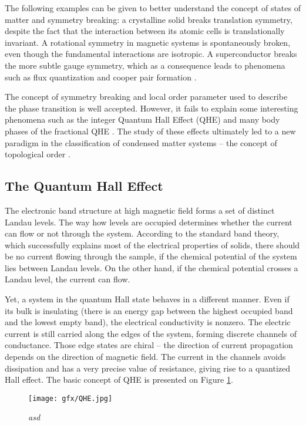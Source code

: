 \documentclass[titlepage,a4paper]{book}
\newcommand{\wciecie}{\quad\phantom{v}}
\begin{document}
The following examples can be given to better understand the concept of states of matter and symmetry breaking: a crystalline solid breaks translation symmetry, despite the fact that the interaction between its atomic cells is translationally invariant. A rotational symmetry in magnetic systems is spontaneously broken, even though the fundamental interactions are isotropic. A superconductor breaks the more subtle gauge symmetry, which as a consequence leads to phenomena such as flux quantization and cooper pair formation \cite{Josephson_Topology}.

The concept of symmetry breaking and local order parameter used to describe the phase transition is well accepted. However, it fails to explain some interesting phenomena such as the integer Quantum Hall Effect (QHE) \cite{Klitzing_Topology} and many body phases of the fractional QHE \cite{Tsui_Topology}. The study of these effects ultimately led to a new paradigm in the classification of condensed matter systems -- the concept of topological order \cite{Laughlin_Topology} \cite{Thouless_Topology}.

\subsection{The Quantum Hall Effect}
\wciecie
The electronic band structure at high magnetic field forms a set of distinct Landau levels. The way how levels are occupied determines whether the current can flow or not through the system. According to the standard band theory, which successfully explains most of the electrical properties of solids, there should be no current flowing through the sample, if the chemical potential of the system lies between Landau levels. On the other hand, if the chemical potential crosses a Landau level, the current can flow. 

Yet, a system in the quantum Hall state behaves in a different manner. Even if its bulk is insulating (there is an energy gap between the highest occupied band and the lowest empty band), the electrical conductivity is nonzero. The electric current is still carried along the edges of the system, forming discrete channels of conductance. Those edge states are chiral -- the direction of current propagation depends on the direction of magnetic field. The current in the channels avoids dissipation and has a very precise value of resistance, giving rise to a quantized Hall effect. The basic concept of QHE is presented on Figure \ref{fig:QHE}. 
\begin{figure}[ht]
	\centering
	\texttt{[image: gfx/QHE.jpg]}
	\vspace{-10pt}
	\caption{\textit{asd}}
	\label{fig:QHE}
\end{figure} 
\end{document}

